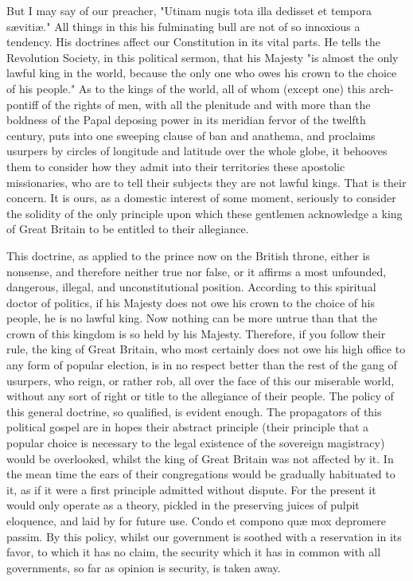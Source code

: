 But I may say of our preacher, "Utinam nugis tota illa dedisset et tempora sævitiæ." All things in this his fulminating bull are not of so innoxious a tendency. His doctrines affect our Constitution in its vital parts. He tells the Revolution Society, in this political sermon, that his Majesty "is almost the only lawful king in the world, because the only one who owes his crown to the choice of his people." As to the kings of the world, all of whom (except one) this arch-pontiff of the rights of men, with all the plenitude and with more than the boldness of the Papal deposing power in its meridian fervor of the twelfth century, puts into one sweeping clause of ban and anathema, and proclaims usurpers by circles of longitude and latitude over the whole globe, it behooves them to consider how they admit into their territories these apostolic missionaries, who are to tell their subjects they are not lawful kings. That is their concern. It is ours, as a domestic interest of some moment, seriously to consider the solidity of the only principle upon which these gentlemen acknowledge a king of Great Britain to be entitled to their allegiance.

This doctrine, as applied to the prince now on the British throne, either is nonsense, and therefore neither true nor false, or it affirms a most unfounded, dangerous, illegal, and unconstitutional position. According to this spiritual doctor of politics, if his Majesty does not owe his crown to the choice of his people, he is no lawful king. Now nothing can be more untrue than that the crown of this kingdom is so held by his Majesty. Therefore, if you follow their rule, the king of Great Britain, who most certainly does not owe his high office to any form of popular election, is in no respect better than the rest of the gang of usurpers, who reign, or rather rob, all over the face of this our miserable world, without any sort of right or title to the allegiance of their people. The policy of this general doctrine, so qualified, is evident enough. The propagators of this political gospel are in hopes their abstract principle (their principle that a popular choice is necessary to the legal existence of the sovereign magistracy) would be overlooked, whilst the king of Great Britain was not affected by it. In the mean time the ears of their congregations would be gradually habituated to it, as if it were a first principle admitted without dispute. For the present it would only operate as a theory, pickled in the preserving juices of pulpit eloquence, and laid by for future use. Condo et compono quæ mox depromere passim. By this policy, whilst our government is soothed with a reservation in its favor, to which it has no claim, the security which it has in common with all governments, so far as opinion is security, is taken away.

